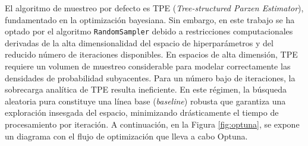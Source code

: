 \documentclass[11pt, a4paper]{article}
\begin{document}
El algoritmo de muestreo por defecto es TPE (\textit{Tree-structured Parzen Estimator}), fundamentado en la optimización bayesiana. Sin embargo, en este trabajo se ha optado por el algoritmo \texttt{RandomSampler} debido a restricciones computacionales derivadas de la alta dimensionalidad del espacio de hiperparámetros y del reducido número de iteraciones disponibles. En espacios de alta dimensión, TPE requiere un volumen de muestreo considerable para modelar correctamente las densidades de probabilidad subyacentes. Para un número bajo de iteraciones, la sobrecarga analítica de TPE resulta ineficiente. En este régimen, la búsqueda aleatoria pura constituye una línea base (\textit{baseline}) robusta que garantiza una exploración insesgada del espacio, minimizando drásticamente el tiempo de procesamiento por iteración. A continuación, en la Figura \ref{fig:optuna}, se expone un diagrama con el flujo de optimización que lleva a cabo Optuna.

\FloatBarrier
\end{document}
